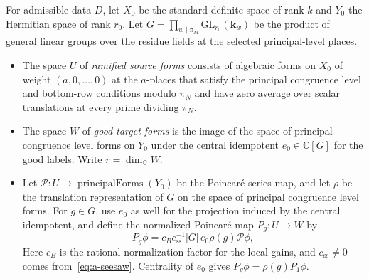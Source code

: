 \begin{definition}
\label{def:source-target-poincare}
\emitthmsource
For admissible data $D$, let $X_0$ be the standard definite space of rank $k$ and $Y_0$ the Hermitian space of rank $r_0$. Let $G=\prod_{w\mid\pi_M}\mathrm{GL}_{r_0}(\mathbf k_w)$ be the product of general linear groups over the residue fields at the selected principal-level places.
\begin{itemize}
\item The space $U$ of \emph{ramified source forms} consists of algebraic forms on $X_0$ of weight $(a,0,\ldots,0)$ at the $a$-places that satisfy the principal congruence level and bottom-row conditions modulo $\pi_N$ and have zero average over scalar translations at every prime dividing $\pi_N$.
\item The space $W$ of \emph{good target forms} is the image of the space of principal congruence level forms on $Y_0$ under the central idempotent $e_0\in\mathbb C[G]$ for the good labels. Write $r=\dim_{\mathbb C}W$.
\item Let $\mathcal P\colon U\to\operatorname{principalForms}(Y_0)$ be the Poincaré series map, and let $\rho$ be the translation representation of $G$ on the space of principal congruence level forms. For $g\in G$, use $e_0$ as well for the projection induced by the central idempotent, and define the normalized Poincaré map $P_g\colon U\to W$ by
\begin{equation}
 P_g\phi=c_B c_{\mathrm{ss}}^{-1}|G|\,e_0\rho(g)\mathcal P\phi,
 \label{eq:normalized-poincare}
\end{equation}
Here $c_B$ is the rational normalization factor for the local gains, and $c_{\mathrm{ss}}\ne0$ comes from~\eqref{eq:a-seesaw}. Centrality of $e_0$ gives $P_g\phi=\rho(g)P_1\phi$.
\end{itemize}
\end{definition}

